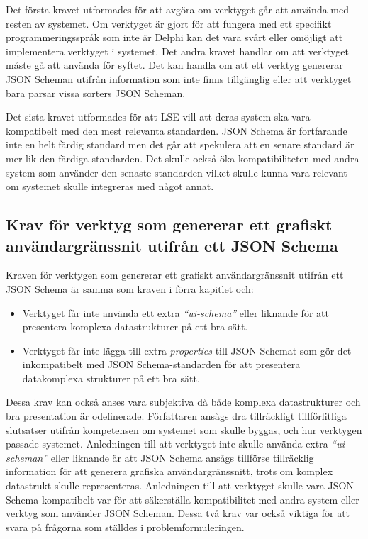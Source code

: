 Det första kravet utformades för att avgöra om verktyget går att använda med resten av systemet. Om verktyget är gjort för att fungera med ett specifikt programmeringsspråk som inte är Delphi kan det vara svårt eller omöjligt att implementera verktyget i systemet. Det andra kravet handlar om att verktyget måste gå att använda för syftet. Det kan handla om att ett verktyg genererar JSON Scheman utifrån information som inte finns tillgänglig eller att verktyget bara parsar vissa sorters JSON Scheman.

Det sista kravet utformades för att LSE vill att deras system ska vara kompatibelt med den mest relevanta standarden. JSON Schema är fortfarande inte en helt färdig standard men det går att spekulera att en senare standard är mer lik den färdiga standarden. Det skulle också öka kompatibiliteten med andra system som använder den senaste standarden vilket skulle kunna vara relevant om systemet skulle integreras med något annat.

\subsection{Krav för verktyg som genererar ett grafiskt användargränssnit utifrån ett JSON Schema}
Kraven för verktygen som genererar ett grafiskt användargränssnit utifrån ett JSON Schema är samma som kraven i förra kapitlet och:

\begin{itemize}
	\item Verktyget får inte använda ett extra \textit{``ui-schema''} eller liknande för att presentera komplexa datastrukturer på ett bra sätt.
	\item Verktyget får inte lägga till extra \textit{properties} till JSON Schemat som gör det inkompatibelt med JSON Schema-standarden för att presentera datakomplexa strukturer på ett bra sätt.
\end{itemize}

Dessa krav kan också anses vara subjektiva då både komplexa datastrukturer och bra presentation är odefinerade. Författaren ansågs dra tillräckligt tillförlitliga slutsatser utifrån kompetensen om systemet som skulle byggas, och hur verktygen passade systemet. Anledningen till att verktyget inte skulle använda extra \textit{``ui-scheman''} eller liknande är att JSON Schema ansågs tillförse tillräcklig information för att generera grafiska användargränssnitt, trots om komplex datastrukt skulle representeras. Anledningen till att verktyget skulle vara JSON Schema kompatibelt var för att säkerställa kompatibilitet med andra system eller verktyg som använder JSON Scheman. Dessa två krav var också viktiga för att svara på frågorna som ställdes i problemformuleringen.

